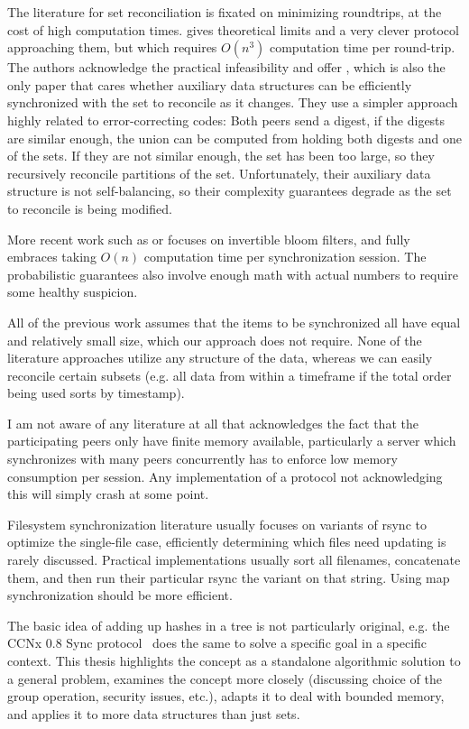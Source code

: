 \documentclass{article}
\begin{document}
The literature for set reconciliation is fixated on minimizing roundtrips, at the cost of high computation times. \cite{minsky2003set} gives theoretical limits and a very clever protocol approaching them, but which requires $O(n^3)$ computation time per round-trip. The authors acknowledge the practical infeasibility and offer \cite{minsky2002practical}, which is also the only paper that cares whether auxiliary data structures can be efficiently synchronized with the set to reconcile as it changes. They use a simpler approach highly related to error-correcting codes: Both peers send a digest, if the digests are similar enough, the union can be computed from holding both digests and one of the sets. If they are not similar enough, the set has been too large, so they recursively reconcile partitions of the set. Unfortunately, their auxiliary data structure is not self-balancing, so their complexity guarantees degrade as the set to reconcile is being modified.

More recent work such as \cite{eppstein2011s} or \cite{ozisik2019graphene} focuses on invertible bloom filters, and fully embraces taking $O(n)$ computation time per synchronization session. The probabilistic guarantees also involve enough math with actual numbers to require some healthy suspicion.

All of the previous work assumes that the items to be synchronized all have equal and relatively small size, which our approach does not require. None of the literature approaches utilize any structure of the data, whereas we can easily reconcile certain subsets (e.g. all data from within a timeframe if the total order being used sorts by timestamp).

I am not aware of any literature at all that acknowledges the fact that the participating peers only have finite memory available, particularly a server which synchronizes with many peers concurrently has to enforce low memory consumption per session. Any implementation of a protocol not acknowledging this will simply crash at some point.

Filesystem synchronization literature usually focuses on variants of rsync to optimize the single-file case, efficiently determining which files need updating is rarely discussed. Practical implementations usually sort all filenames, concatenate them, and then run their particular rsync the variant on that string. Using map synchronization should be more efficient.

The basic idea of adding up hashes in a tree is not particularly original, e.g. the CCNx  0.8 Sync protocol~\cite{shang2017survey} does the same to solve a specific goal in a specific context.  This thesis highlights the concept as a standalone algorithmic solution to a general problem, examines the concept more closely (discussing choice of the group operation, security issues, etc.), adapts it to deal with bounded memory, and applies it to more data structures than just sets.
\end{document}
